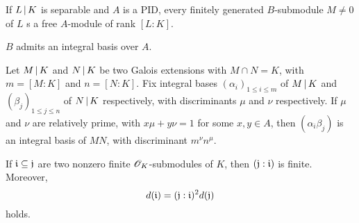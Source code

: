 \begin{prop}
  If $L \mathop{|} K$ is separable and $A$ is a PID, every finitely
  generated $B$-submodule $M\ne 0$ of $L$ s a free $A$-module of rank $[L:K]$.
\end{prop}
\begin{corollary}
  $B$ admits an integral basis over $A$.
\end{corollary}

\begin{prop}
  Let $M \mathop{|} K$ and $N \mathop{|} K$ be two Galois extensions
  with $M \cap N = K$, with $m = [M:K]$ and $n = [N:K]$. Fix integral bases
  $(\alpha_i)_{1 \le i \le m}$ of $M \mathop{|} K$ and $(\beta_j)_{1 \le j
  \le n}$ of $N \mathop{|} K$ respectively, with discriminants $\mu$ and
  $\nu$ respectively. If $\mu$ and $\nu$ are relatively prime, with $x\mu+y\nu
  = 1$ for some $x,y\in A$, then $(\alpha_i\beta_j)$ is an integral basis of
  $MN$, with discriminant $m^\nu n^\mu$.
\end{prop}


\begin{prop}
  If $\mathfrak{i} \subseteq \mathfrak{j}$ are two nonzero finite $\mathscr{O}_K$-submodules of $K$, then
  $(\mathfrak{j}:\mathfrak{i})$ is finite. Moreover,
  \[ d(\mathfrak{i}) = (\mathfrak{j}:\mathfrak{i})^2d(\mathfrak{j}) \] holds.
\end{prop}
